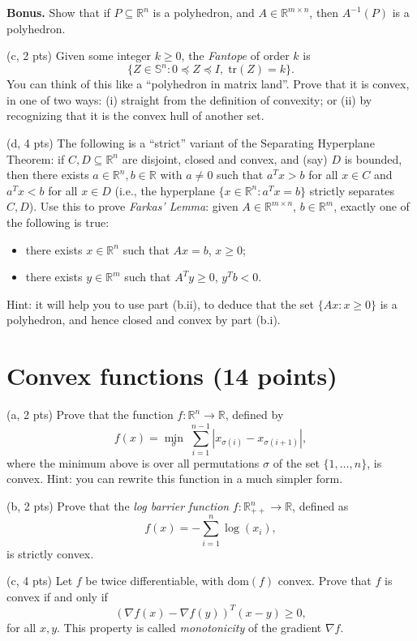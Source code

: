 \documentclass{article}
\theoremstyle{remark}
\theoremstyle{definition}
\def\R{\mathbb{R}}
\def\S{\mathbb{S}}
\def\tr{\mathrm{tr}}
\begin{document}
\noindent
{\bf Bonus.} Show that if $P \subseteq \R^n$ is a polyhedron, and $A \in \R^{m
  \times n}$, then $A^{-1}(P)$ is a polyhedron.  

\bigskip
\noindent
(c, 2 pts) Given some integer $k \geq 0$, the {\it Fantope} of order $k$ is   
$$
\{ Z \in \S^n : 0 \preceq Z \preceq I, \; \tr(Z)=k \}.
$$
You can think of this like a ``polyhedron in matrix land''.  Prove that it
is convex, in one of two ways: (i) straight from the definition of convexity;
or (ii) by recognizing that it is the convex hull of another set.  

\bigskip
\noindent
(d, 4 pts) The following is a ``strict'' variant of the Separating
Hyperplane Theorem: if $C,D \subseteq \R^n$ are disjoint, closed
and convex, and (say) $D$ is bounded, then there exists $a \in
\R^n, b \in \R$ with $a\not=0$ such that $a^T x > b$ for all $x \in C$
and $a^T x < b$ for all $x \in D$ (i.e., the hyperplane $\{x \in
\R^n: a^T x = b\}$ strictly separates $C,D$).  Use this to prove   
{\it Farkas' Lemma}: 
given $A \in \R^{m \times n}$, $b \in \R^m$, exactly one of the following is
true: 
\begin{itemize}
\item there exists $x\in \R^n$ such that $Ax=b$, $x \geq 0$;
\item there exists $y\in \R^m$ such that $A^Ty \geq 0$, $y^Tb < 0$.  
\end{itemize}
Hint: it will help you to use part (b.ii), to deduce that the set
$\{Ax : x \geq 0\}$ is a polyhedron, and hence closed and convex by
part (b.i).

\section{Convex functions (14 points)}

\noindent
(a, 2 pts) Prove that the function $f : \R^n \to \R$, defined by
$$
f(x) = \min_\sigma \; \sum_{i=1}^{n-1} |x_{\sigma(i)} - x_{\sigma(i+1)}|,
$$
where the minimum above is over all permutations $\sigma$ of the set
$\{1,\ldots,n\}$, is convex. Hint: you can rewrite this function in a much
simpler form. 

\bigskip
\noindent
(b, 2 pts) Prove that the {\it log barrier function} $f:\R^n_{++} \to \R$,
defined as 
$$
f(x) = -\sum_{i=1}^n \log(x_i),
$$
is strictly convex.

\bigskip
\noindent
(c, 4 pts) Let $f$ be twice differentiable, with $\mathrm{dom}(f)$ convex.  Prove
that $f$ is convex if and only if  
$$
(\nabla f(x) - \nabla f(y))^T (x-y) \geq 0,
$$
for all $x,y$.  This property is called {\it monotonicity} of the
gradient $\nabla f$.  
\end{document}
